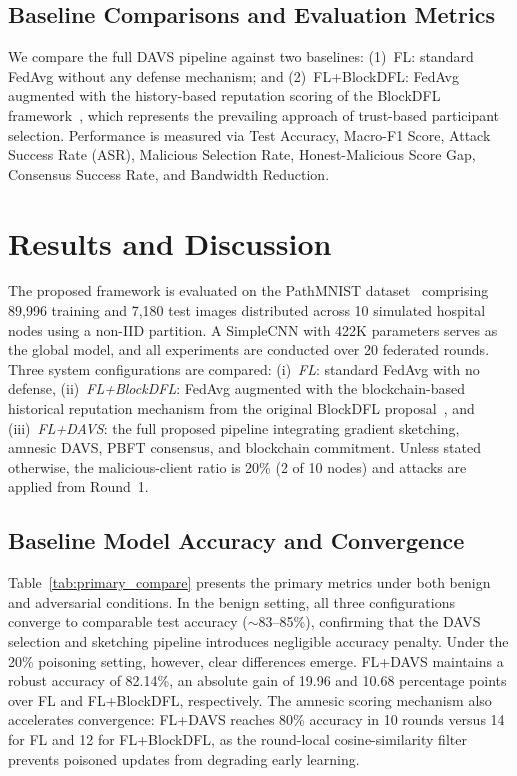 \documentclass[conference]{IEEEtran}
\begin{document}
\subsection{Baseline Comparisons and Evaluation Metrics}
We compare the full DAVS pipeline against two baselines: (1)~FL: standard FedAvg without any defense mechanism; and (2)~FL+BlockDFL: FedAvg augmented with the history-based reputation scoring of the BlockDFL framework~\cite{blockdfl}, which represents the prevailing approach of trust-based participant selection. Performance is measured via Test Accuracy, Macro-F1 Score, Attack Success Rate (ASR), Malicious Selection Rate, Honest-Malicious Score Gap, Consensus Success Rate, and Bandwidth Reduction.

\section{Results and Discussion}

The proposed framework is evaluated on the PathMNIST dataset~\cite{medmnist} comprising 89,996 training and 7,180 test images distributed across 10 simulated hospital nodes using a non-IID partition. A SimpleCNN with 422K parameters serves as the global model, and all experiments are conducted over 20 federated rounds. Three system configurations are compared: (i)~\textit{FL}: standard FedAvg with no defense, (ii)~\textit{FL+BlockDFL}: FedAvg augmented with the blockchain-based historical reputation mechanism from the original BlockDFL proposal~\cite{blockdfl}, and (iii)~\textit{FL+DAVS}: the full proposed pipeline integrating gradient sketching, amnesic DAVS, PBFT consensus, and blockchain commitment. Unless stated otherwise, the malicious-client ratio is 20\% (2 of 10 nodes) and attacks are applied from Round~1.

\subsection{Baseline Model Accuracy and Convergence}
Table~\ref{tab:primary_compare} presents the primary metrics under both benign and adversarial conditions. In the benign setting, all three configurations converge to comparable test accuracy ($\sim$83--85\%), confirming that the DAVS selection and sketching pipeline introduces negligible accuracy penalty. Under the 20\% poisoning setting, however, clear differences emerge. FL+DAVS maintains a robust accuracy of 82.14\%, an absolute gain of 19.96 and 10.68 percentage points over FL and FL+BlockDFL, respectively. The amnesic scoring mechanism also accelerates convergence: FL+DAVS reaches 80\% accuracy in 10 rounds versus 14 for FL and 12 for FL+BlockDFL, as the round-local cosine-similarity filter prevents poisoned updates from degrading early learning.
\end{document}
